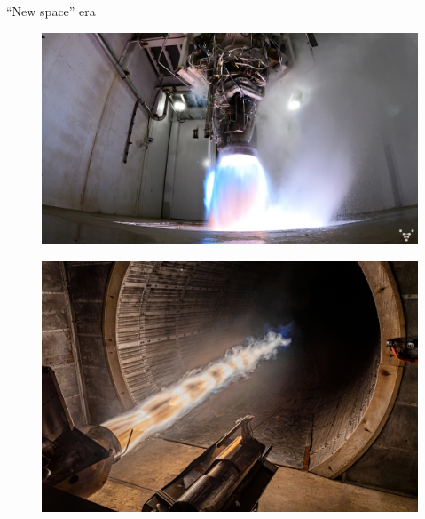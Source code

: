 \documentclass[]{beamer}
\begin{document}
\begin{frame}{``New space'' era}
\begin{minipage}{0.33\linewidth}
\begin{figure}
			\includegraphics[width=0.99\linewidth]{aeonR.png}
		\end{figure}
	\end{minipage}
	\begin{minipage}{0.28\linewidth}
		\begin{figure}
			\includegraphics[width=0.99\linewidth]{delphin.jpeg}
		\end{figure}
	\end{minipage}
\end{frame}
\end{document}
